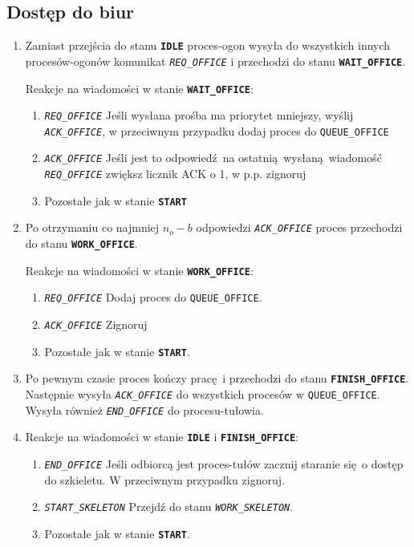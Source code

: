 \documentclass[12pt]{article}
\newcommand{\state}[1]{\texttt{\textbf{#1}}}
\newcommand{\msg}[1]{\texttt{\emph{#1}}}
\newcommand{\var}[1]{\texttt{#1}}
\begin{document}
\subsection{Dostęp do biur}
\begin{enumerate}
	\item Zamiast przejścia do stanu \state{IDLE} proces-ogon wysyła do wszystkich innych procesów-ogonów komunikat \msg{REQ\_OFFICE} i przechodzi do stanu \state{WAIT\_OFFICE}.
	
	Reakcje na wiadomości w stanie \state{WAIT\_OFFICE}:
	\begin{enumerate}
		\item \msg{REQ\_OFFICE} Jeśli wysłana prośba ma priorytet mniejszy, wyślij \msg{ACK\_OFFICE}, w przeciwnym przypadku dodaj proces do \var{QUEUE\_OFFICE}
		\item \msg{ACK\_OFFICE} Jeśli jest to odpowiedź na ostatnią wysłaną wiadomość \msg{REQ\_OFFICE} zwiększ licznik ACK o 1, w p.p. zignoruj
		\item  Pozostałe jak w stanie \state{START}
	\end{enumerate}
	
	\item Po otrzymaniu co najmniej $n_o - b$ odpowiedzi \msg{ACK\_OFFICE} proces przechodzi do stanu \state{WORK\_OFFICE}.
	
	Reakcje na wiadomości w stanie \state{WORK\_OFFICE}:
	\begin{enumerate}
		\item \msg{REQ\_OFFICE} Dodaj proces do \var{QUEUE\_OFFICE}.
		\item \msg{ACK\_OFFICE} Zignoruj
		\item  Pozostałe jak w stanie \state{START}.
	\end{enumerate}
	
	\item Po pewnym czasie proces kończy pracę i przechodzi do stanu \state{FINISH\_OFFICE}. Następnie wysyła \msg{ACK\_OFFICE} do wszystkich procesów w \var{QUEUE\_OFFICE}. Wysyła również \msg{END\_OFFICE} do procesu-tułowia.
	
	\item Reakcje na wiadomości w stanie \state{IDLE} i \state{FINISH\_OFFICE}:
	\begin{enumerate}
		\item \msg{END\_OFFICE} Jeśli odbiorcą jest proces-tułów zacznij staranie się o dostęp do szkieletu. W przeciwnym przypadku zignoruj.
		\item \msg{START\_SKELETON} Przejdź do stanu \msg{WORK\_SKELETON}.
		\item Pozostałe jak w stanie \state{START}.
	\end{enumerate}
\end{enumerate}
\end{document}
